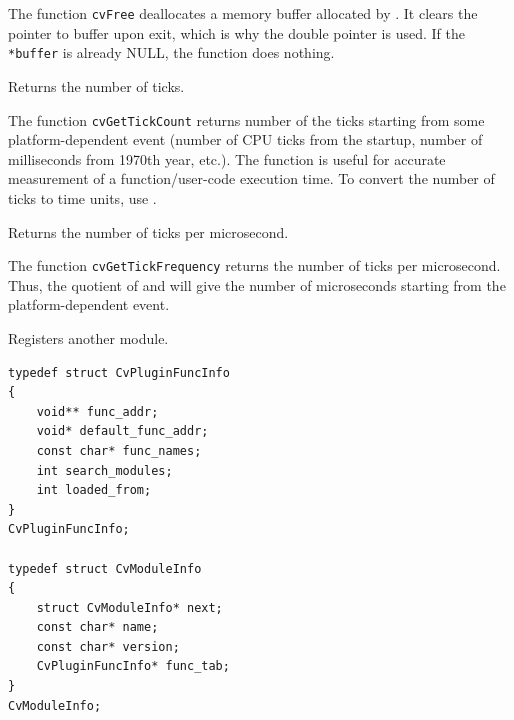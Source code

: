\begin{description}
\end{description}

The function \texttt{cvFree} deallocates a memory buffer allocated by
. It clears the pointer to buffer upon exit, which is why
the double pointer is used. If the \texttt{*buffer} is already NULL, the function
does nothing.

\label{GetTickCount}

Returns the number of ticks.


The function \texttt{cvGetTickCount} returns number of the ticks starting from some platform-dependent event (number of CPU ticks from the startup, number of milliseconds from 1970th year, etc.). The function is useful for accurate measurement of a function/user-code execution time. To convert the number of ticks to time units, use .

\label{GetTickFrequency}

Returns the number of ticks per microsecond.


The function \texttt{cvGetTickFrequency} returns the number of ticks per microsecond. Thus, the quotient of  and  will give the number of microseconds starting from the platform-dependent event.

\label{RegisterModule}

Registers another module.

\begin{lstlisting}
typedef struct CvPluginFuncInfo
{
    void** func_addr;
    void* default_func_addr;
    const char* func_names;
    int search_modules;
    int loaded_from;
}
CvPluginFuncInfo;

typedef struct CvModuleInfo
{
    struct CvModuleInfo* next;
    const char* name;
    const char* version;
    CvPluginFuncInfo* func_tab;
}
CvModuleInfo;
\end{lstlisting}


\begin{description}
\end{description}

